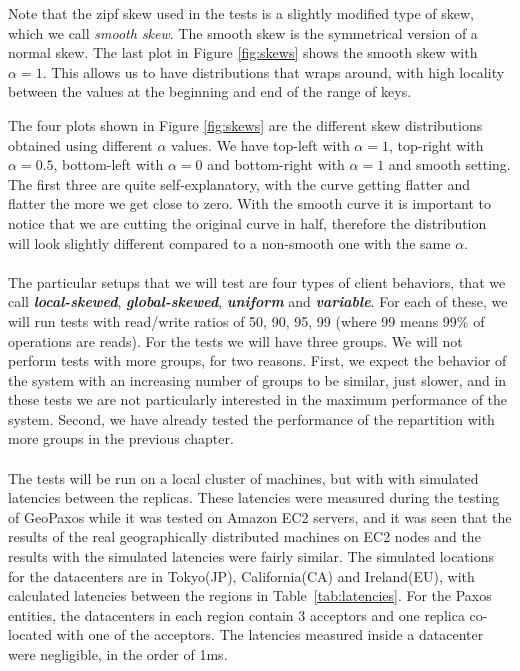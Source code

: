 Note that the zipf skew used in the tests is a slightly modified type of skew, which we call \emph{smooth skew}. The smooth skew is the symmetrical version of a normal skew. The last plot in Figure \ref{fig:skews} shows the smooth skew with $\alpha=1$. This allows us to have distributions that wraps around, with high locality between the values at the beginning and end of the range of keys.

The four plots shown in Figure \ref{fig:skews} are the different skew distributions obtained using different $\alpha$ values. We have top-left with $\alpha = 1$, top-right with $\alpha = 0.5$, bottom-left with $\alpha = 0$ and bottom-right with $\alpha = 1$ and smooth setting. The first three are quite self-explanatory, with the curve getting flatter and flatter the more we get close to zero. With the smooth curve it is important to notice that we are cutting the original curve in half, therefore the distribution will look slightly different compared to a non-smooth one with the same $\alpha$.
\\\\
The particular setups that we will test are four types of client behaviors, that we call \textbf{\emph{local-skewed}}, \textbf{\emph{global-skewed}}, \textbf{\emph{uniform}} and \textbf{\emph{variable}}. For each of these, we will run tests with read/write ratios of 50, 90, 95, 99 (where 99 means 99\% of operations are  reads). For the tests we will have three groups. We will not perform tests with more groups, for two reasons. First, we expect the behavior of the system with an increasing number of groups to be similar, just slower, and in these tests we are not particularly interested in the maximum performance of the system. Second, we have already tested the performance of the repartition with more groups in the previous chapter.
\\\\
The tests will be run on a local cluster of machines, but with with simulated latencies between the replicas. These latencies were measured during the testing of GeoPaxos while it was tested on Amazon EC2 servers, and it was seen that the results of the real geographically distributed machines on EC2 nodes and the results with the simulated latencies were fairly similar. The simulated locations for the datacenters are in Tokyo(JP), California(CA) and Ireland(EU), with calculated latencies between the regions in Table~\ref{tab:latencies}. For the Paxos entities, the datacenters in each region contain 3 acceptors and one replica co-located with one of the acceptors. The latencies measured inside a datacenter were negligible, in the order of 1ms.


